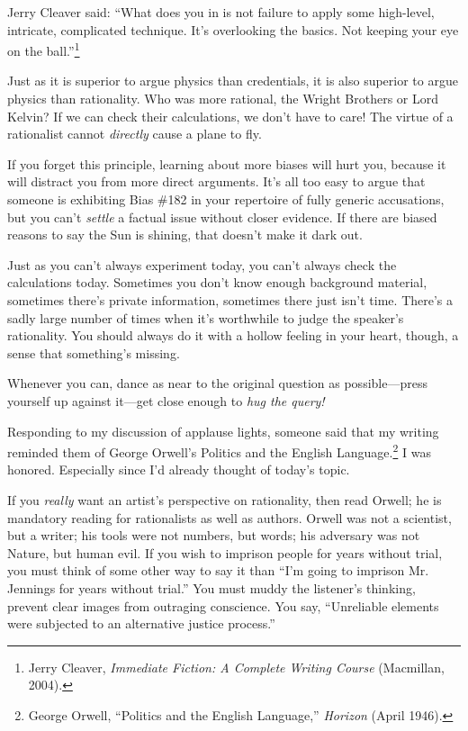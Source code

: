 {
 Jerry Cleaver said: ``What does you in is not
failure to apply some high-level, intricate, complicated technique.
It's overlooking the basics. Not keeping your eye on
the ball.''\footnote{Jerry Cleaver, \textit{Immediate Fiction: A Complete Writing
Course} (Macmillan, 2004).}}

{
 Just as it is superior to argue physics than credentials, it is
also superior to argue physics than rationality. Who was more rational,
the Wright Brothers or Lord Kelvin? If we can check their calculations,
we don't have to care! The virtue of a rationalist
cannot \textit{directly} cause a plane to fly.}

{
 If you forget this principle, learning about more biases will hurt
you, because it will distract you from more direct arguments.
It's all too easy to argue that someone is exhibiting
Bias \#182 in your repertoire of fully generic accusations, but you
can't \textit{settle} a factual issue without closer
evidence. If there are biased reasons to say the Sun is shining, that
doesn't make it dark out.}

{
 Just as you can't always experiment today, you
can't always check the calculations today. Sometimes
you don't know enough background material, sometimes
there's private information, sometimes there just
isn't time. There's a sadly large
number of times when it's worthwhile to judge the
speaker's rationality. You should always do it with a
hollow feeling in your heart, though, a sense that
something's missing.}

{
 Whenever you can, dance as near to the original question as
possible---press yourself up against it---get close enough to
\textit{hug the query!}}

\myendsectiontext


\bigskip


{
 Responding to my discussion of applause lights, someone said that
my writing reminded them of George Orwell's Politics
and the English Language.\footnote{George Orwell, ``Politics and the English
Language,'' \textit{Horizon} (April 1946).} I was honored. Especially
since I'd already thought of today's
topic. }

{
 If you \textit{really} want an artist's
perspective on rationality, then read Orwell; he is mandatory reading
for rationalists as well as authors. Orwell was not a scientist, but a
writer; his tools were not numbers, but words; his adversary was not
Nature, but human evil. If you wish to imprison people for years
without trial, you must think of some other way to say it than
``I'm going to imprison Mr. Jennings
for years without trial.'' You must muddy the
listener's thinking, prevent clear images from
outraging conscience. You say, ``Unreliable elements
were subjected to an alternative justice process.''}

